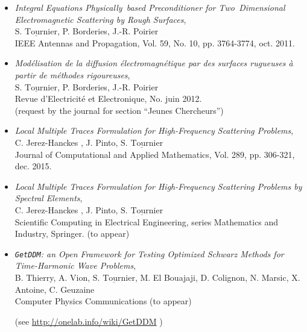 \documentclass[a4paper,10pt,twoside]{article}
\newcommand\moi{$\underline{\textrm{S. Tournier}}$}
\begin{document}
\begin{itemize}
\item[\textbullet]
\emph{Integral Equations Physically~based Preconditioner for Two~Dimensional Electromagnetic Scattering by Rough Surfaces}, \\
 \moi , P. Borderies, J.-R. Poirier \\
\textsf{IEEE Antennas and Propagation},
Vol. 59, No. 10, pp. 3764-3774, oct. 2011. \\[-1ex]
\item[\textbullet]
\emph{Modélisation de la diffusion électromagnétique par des surfaces
  rugueuses à partir de méthodes rigoureuses},\\
\moi , P. Borderies, J.-R. Poirier \\
\textsf{R}evue d'\textsf{E}lectricité et \textsf{E}lectronique,
No. juin 2012.\\
(request by the journal for section ``Jeunes Chercheurs'')
\item[\textbullet]
\emph{Local Multiple Traces Formulation for High-Frequency Scattering Problems},\\
 C. Jerez-Hanckes , J. Pinto, \moi \\
 \textsf{Journal of Computational and Applied Mathematics},
 Vol. 289, pp. 306-321, dec. 2015. %
\item[\textbullet]
 \emph{Local Multiple Traces Formulation for High-Frequency Scattering
   Problems by Spectral Elements},\\
 C. Jerez-Hanckes , J. Pinto, \moi \\
\textsf{Scientific Computing in Electrical Engineering}, series
Mathematics and Industry, Springer. (to appear)
\item[\textbullet]
  \emph{\texttt{GetDDM}: an Open Framework for Testing Optimized Schwarz
    Methods for Time-Harmonic Wave Problems},\\
  B. Thierry, A. Vion, \moi, M. El Bouajaji,
  D. Colignon, N. Marsic, X. Antoine, C. Geuzaine\\
  \textsf{Computer Physics Communications} (to appear)
  \begin{flushright}
    (see \url{http://onelab.info/wiki/GetDDM} )
  \end{flushright}
\end{itemize}

\end{document}
